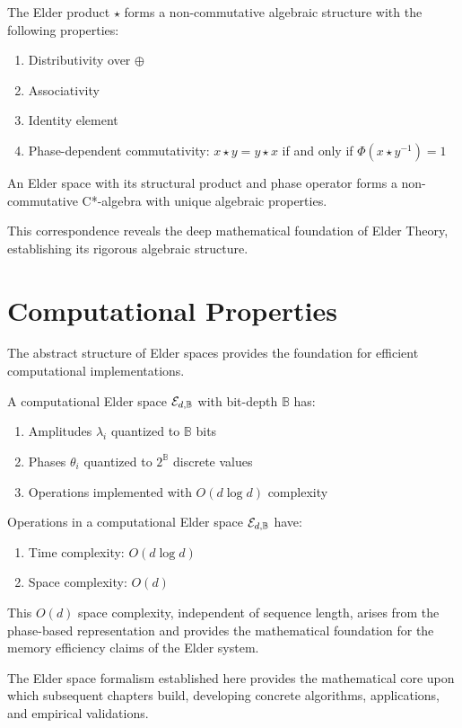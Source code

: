 The Elder product $\star$ forms a non-commutative algebraic structure with the following properties:
\begin{enumerate}
    \item Distributivity over $\oplus$
    \item Associativity
    \item Identity element
    \item Phase-dependent commutativity: $x \star y = y \star x$ if and only if $\Phi(x \star y^{-1}) = 1$
\end{enumerate}

\begin{theorem}
\label{thm:elder-structural}
An Elder space with its structural product and phase operator forms a non-commutative C*-algebra with unique algebraic properties.
\end{theorem}

This correspondence reveals the deep mathematical foundation of Elder Theory, establishing its rigorous algebraic structure.

\section{Computational Properties}

The abstract structure of Elder spaces provides the foundation for efficient computational implementations.

\begin{definition}
A computational Elder space $\mathcal{E}_{d, \mathbb{B}}$ with bit-depth $\mathbb{B}$ has:
\begin{enumerate}
    \item Amplitudes $\lambda_i$ quantized to $\mathbb{B}$ bits
    \item Phases $\theta_i$ quantized to $2^{\mathbb{B}}$ discrete values
    \item Operations implemented with $O(d \log d)$ complexity
\end{enumerate}
\end{definition}

\begin{theorem}
Operations in a computational Elder space $\mathcal{E}_{d, \mathbb{B}}$ have:
\begin{enumerate}
    \item Time complexity: $O(d \log d)$
    \item Space complexity: $O(d)$
\end{enumerate}
\end{theorem}

This $O(d)$ space complexity, independent of sequence length, arises from the phase-based representation and provides the mathematical foundation for the memory efficiency claims of the Elder system.

The Elder space formalism established here provides the mathematical core upon which subsequent chapters build, developing concrete algorithms, applications, and empirical validations.